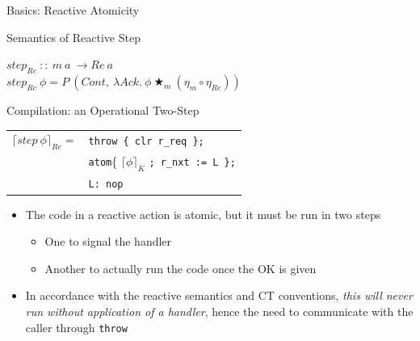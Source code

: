 \documentclass{beamer}
\begin{document}
\begin{frame}{Basics: Reactive Atomicity}

\begin{structure}{Semantics of Reactive Step}

\begin{onlinebox}{8cm}

$step_{Re}\ ::\ m\ a\ \rightarrow Re\ a$\\
$step_{Re}\ \phi = P\ (Cont,\ \lambda Ack .\ \phi\ \bigstar_m\ (\eta_m \circ \eta_{Re}))$\\

\end{onlinebox}

\end{structure}

\bigskip

\begin{structure}{Compilation: an Operational Two-Step}
\begin{onlinebox}{9cm}

\begin{tabular}[t]{ll}
$\lceil step\ \phi \rceil_{Re} =$ &\texttt{throw \{ clr r\_req \};}\\
&\texttt{atom}\{ $\lceil \phi \rceil_K$ \texttt{; r\_nxt := L \};}\\
&\texttt{L: nop} \\

\end{tabular}

\end{onlinebox}

\medskip

\begin{itemize}

\item{The code in a reactive action is atomic, but it must be run in two steps}
\begin{itemize}\item{One to signal the handler}\item{Another to actually run the code once the OK is given}\end{itemize}

\item{In accordance with the reactive semantics and CT conventions, \emph{this will never run without application of a handler}, hence the need to communicate with the caller through \texttt{throw}}


\end{itemize}
\end{structure}

\end{frame}
\end{document}
